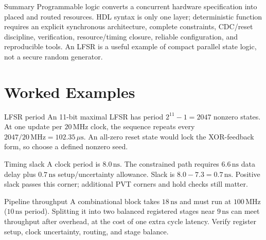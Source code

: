 \documentclass[10pt,letterpaper]{article}
\begin{document}
\begin{CornellNotesTable}
\end{CornellNotesTable}
\begin{CornellSummaryBox}{Summary}
Programmable logic converts a concurrent hardware specification into placed and routed resources. HDL syntax is only one layer; deterministic function requires an explicit synchronous architecture, complete constraints, CDC/reset discipline, verification, resource/timing closure, reliable configuration, and reproducible tools. An LFSR is a useful example of compact parallel state logic, not a secure random generator.
\end{CornellSummaryBox}
\section{Worked Examples}
\begin{CornellExamBox}{LFSR period}
An 11-bit maximal LFSR has period $2^{11}-1=2047$ nonzero states. At one update per $20\,\mathrm{MHz}$ clock, the sequence repeats every $2047/20\,\mathrm{MHz}=102.35\,\mu\mathrm{s}$. An all-zero reset state would lock the XOR-feedback form, so choose a defined nonzero seed.
\end{CornellExamBox}
\begin{CornellExamBox}{Timing slack}
A clock period is $8.0\,\mathrm{ns}$. The constrained path requires $6.6\,\mathrm{ns}$ data delay plus $0.7\,\mathrm{ns}$ setup/uncertainty allowance. Slack is $8.0-7.3=0.7\,\mathrm{ns}$. Positive slack passes this corner; additional PVT corners and hold checks still matter.
\end{CornellExamBox}
\begin{CornellExamBox}{Pipeline throughput}
A combinational block takes $18\,\mathrm{ns}$ and must run at $100\,\mathrm{MHz}$ ($10\,\mathrm{ns}$ period). Splitting it into two balanced registered stages near $9\,\mathrm{ns}$ can meet throughput after overhead, at the cost of one extra cycle latency. Verify register setup, clock uncertainty, routing, and stage balance.
\end{CornellExamBox}
\end{document}
